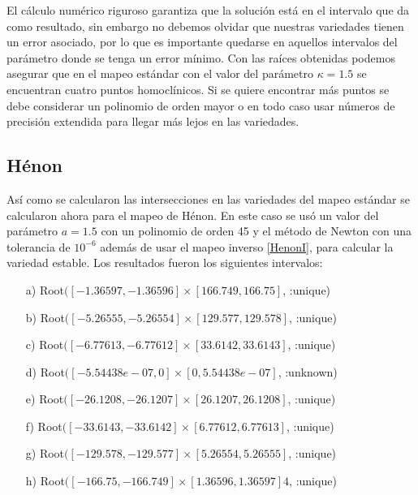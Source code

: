 El cálculo numérico riguroso garantiza que la solución está en el intervalo que da como resultado, sin embargo no debemos olvidar que nuestras variedades tienen un error asociado, por lo que es importante quedarse en aquellos intervalos del parámetro donde se tenga un error mínimo. Con las raíces obtenidas podemos asegurar que en el mapeo estándar con el valor del parámetro $\kappa=1.5$ se encuentran cuatro puntos homoclínicos. Si se quiere encontrar más puntos se debe considerar un polinomio de orden mayor o en todo caso usar números de precisión extendida para llegar más lejos en las variedades. 



\subsection{Hénon}
Así como se calcularon las intersecciones en las variedades del mapeo estándar se calcularon ahora para el mapeo de Hénon. En este caso se usó un valor del parámetro $a=1.5$ con un polinomio de orden 45 y el método de Newton con una tolerancia de $10^{-6}$ además de usar el mapeo inverso \ref{HenonI}, para calcular la variedad estable. Los resultados fueron los siguientes intervalos:
\begin{itemize}
\item[a)] Root$([-1.36597, -1.36596] \times [166.749, 166.75]$, :unique)
\item[b)] Root$([-5.26555, -5.26554] \times [129.577, 129.578]$, :unique)
\item[c)] Root$([-6.77613, -6.77612] \times [33.6142, 33.6143]$, :unique)
\item[d)] Root$([-5.54438e-07, 0] \times [0, 5.54438e-07]$, :unknown)     
\item[e)] Root$([-26.1208, -26.1207] \times [26.1207, 26.1208]$, :unique)  
\item[f)] Root$([-33.6143, -33.6142] \times [6.77612, 6.77613]$, :unique)  
\item[g)] Root$([-129.578, -129.577] \times [5.26554, 5.26555]$, :unique) 
\item[h)] Root$([-166.75, -166.749] \times [1.36596, 1.36597]4$, :unique)
\end{itemize}

